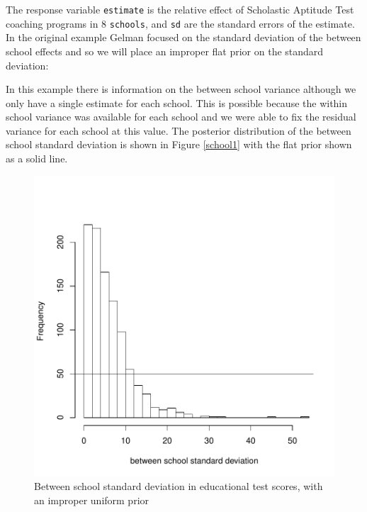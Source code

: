 \documentclass{article}
\begin{document}
The response variable \texttt{estimate} is the relative effect of Scholastic Aptitude Test coaching programs in 8 \texttt{schools}, and \texttt{sd} are the standard errors of the estimate. In the original example Gelman focused on the standard deviation of the between school effects and so we will place an improper flat prior on the standard deviation:  

\begin{Schunk}
\end{Schunk}

In this example there is information on the between school variance although we only have a single estimate for each school. This is possible because the within school variance was available for each school and we were able to fix the residual variance for each school at this value. The posterior distribution of the between school standard deviation is shown in Figure \ref{school1} with the flat prior shown as a solid line. 


\begin{figure}[!h]
\begin{center}
\includegraphics{Lecture8-011}
\end{center}
\caption{Between school standard deviation in educational test scores, with an improper uniform prior}
\label{school1-fig}
\end{figure}
\end{document}
